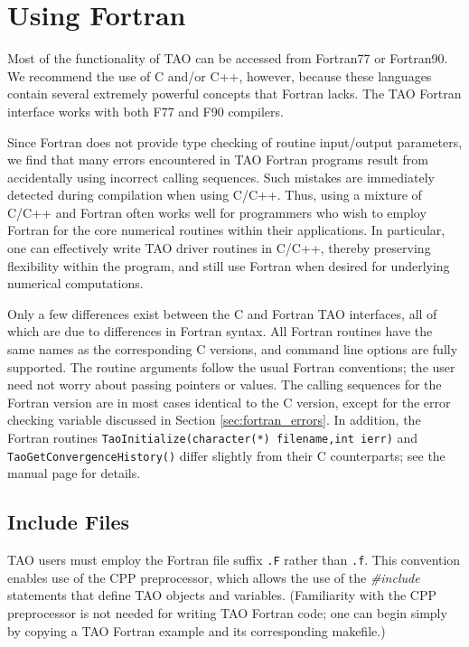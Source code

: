 \section{Using Fortran}
\label{chapter:fortran}
Most of the functionality of TAO can be accessed from Fortran77 or 
Fortran90.  We recommend the use of C and/or C++, however, 
because these languages contain several extremely powerful concepts 
that Fortran lacks.  The TAO Fortran interface works with 
both F77 and F90 compilers.

Since Fortran does not provide type checking of routine input/output
parameters, we find that many errors encountered in TAO Fortran
programs result from accidentally using incorrect calling sequences.
Such mistakes are immediately detected during compilation when using
C/C++.  Thus, using a mixture of C/C++ and Fortran often works well
for programmers who wish to employ Fortran for the core numerical
routines within their applications.  In particular, one can
effectively write TAO driver routines in C/C++, thereby preserving
flexibility within the program, and still use Fortran when desired for
underlying numerical computations.


Only a few differences exist between the C and Fortran TAO interfaces,
all of which are due to differences in Fortran syntax.  All Fortran
routines have the same names as the corresponding C versions, and
command line options are fully supported. The routine arguments follow
the usual Fortran conventions; the user need not worry about passing
pointers or values.  The calling sequences for the Fortran version are
in most cases identical to the C version, except for the error
checking variable discussed in Section \ref{sec:fortran_errors}.  In
addition, the Fortran routines {\tt TaoInitialize(character(*) filename,int ierr)} and {\tt TaoGetConvergenceHistory()}
differ slightly from their C counterparts; see the manual page for
details.

\subsection{Include Files}
\label{sec:fortran_includes}

TAO users must employ the Fortran file suffix {\tt .F}
rather than {\tt .f}.  This convention enables use of the CPP
preprocessor, which allows the use of the {\em \#include} statements
that define TAO objects and variables. (Familiarity with the CPP
preprocessor is not needed for writing TAO Fortran code; one can
begin simply by copying a TAO Fortran example and its corresponding
makefile.)  

